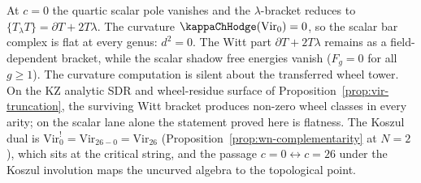 \begin{remark}
\label{rem:vir-zero-type-V}
At $c = 0$ the quartic scalar pole vanishes and the $\lambda$-bracket
reduces to $\{T{}_\lambda T\} = \partial T + 2T\lambda$. The
curvature $\kappaChHodge(\mathrm{Vir}_0) = 0$, so the scalar bar
complex is flat at every genus: $d^2 = 0$. The Witt part
$\partial T+2T\lambda$ remains as a field-dependent bracket, while
the scalar shadow free energies vanish ($F_g = 0$ for all $g \ge 1$).
The curvature computation is silent about the transferred wheel tower.
On the KZ analytic SDR and wheel-residue surface of
Proposition~\ref{prop:vir-truncation}, the surviving Witt bracket
produces non-zero wheel classes in every arity; on the scalar lane
alone the statement proved here is flatness. The Koszul dual is
$\mathrm{Vir}_0^! = \mathrm{Vir}_{26-0} = \mathrm{Vir}_{26}$
(Proposition~\ref{prop:wn-complementarity} at $N = 2$),
which sits at the critical string, and the passage
$c = 0 \leftrightarrow c = 26$ under the Koszul involution maps
the uncurved algebra to the topological point.
\end{remark}

